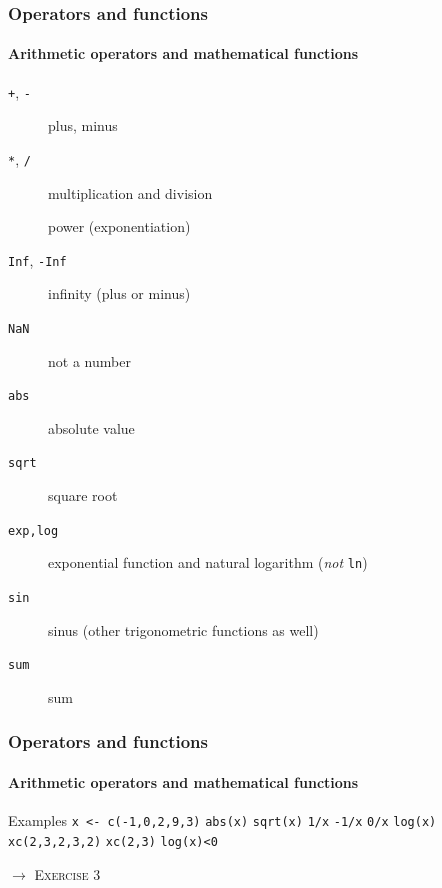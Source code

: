 \documentclass[title={Introduction to R}, author={Mutschler and Zaharieva}, inst={Institute for Econometrics and Empirical Economics}]{beamer}
\begin{document}
\begin{frame}
\frametitle{Operators and functions}
\framesubtitle{Arithmetic operators and mathematical functions}
\begin{description}
\item[\texttt{+}, \texttt{-}] plus, minus
\item[\texttt{*}, \texttt{/}] multiplication and division
\item[\texttt{}] power (exponentiation)
\item[\texttt{Inf}, \texttt{-Inf}] infinity (plus or minus)
\item[\texttt{NaN}] not a number
\item[\texttt{abs}] absolute value
\item[\texttt{sqrt}] square root
\item[\texttt{exp,log}] exponential function and natural logarithm (\emph{not} \texttt{ln})
\item[\texttt{sin}] sinus (other trigonometric functions as well)
\item[\texttt{sum}] sum
\end{description}
\end{frame}


\begin{frame}
\frametitle{Operators and functions}
\framesubtitle{Arithmetic operators and mathematical functions}
\begin{block}{Examples}
\texttt{x <- c(-1,0,2,9,3)}\newline
\texttt{abs(x)}\newline
\texttt{sqrt(x)}\newline
\texttt{1/x}\newline
\texttt{-1/x}\newline
\texttt{0/x}\newline
\texttt{log(x)}\newline
\texttt{xc(2,3,2,3,2)}\newline
\texttt{xc(2,3)}\newline
\texttt{log(x)<0}
\end{block}\pause
$\longrightarrow $ \textsc{Exercise 3}
\end{frame}
\end{document}
